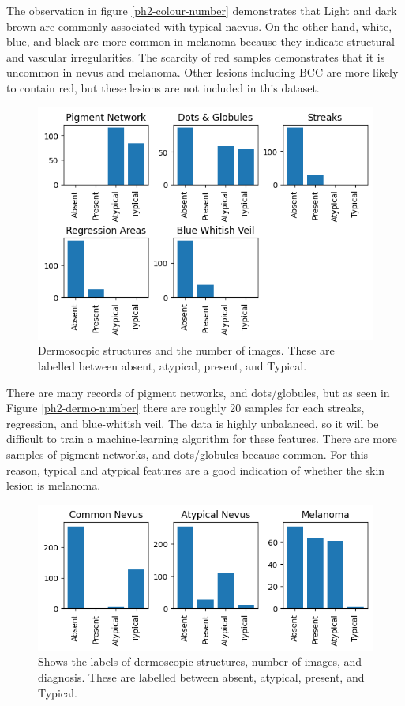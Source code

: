 The observation in figure \ref{ph2-colour-number} demonstrates that Light and dark brown are commonly associated with typical naevus. On the other hand, white, blue, and black are more common in melanoma because they indicate structural and vascular irregularities. The scarcity of red samples demonstrates that it is uncommon in nevus and melanoma. Other lesions including BCC are more likely to contain red\cite{}, but these lesions are not included in this dataset.

\begin{figure}
	\centering
	\includegraphics[scale=0.8]{images/ph2/ph2-dermo-number.png}
	\caption{Dermosocpic structures and the number of images. These are labelled between absent, atypical, present, and Typical.} 
\end{figure} \label{ph2-dermo-number}

There are many records of pigment networks, and dots/globules, but as seen in Figure \ref{ph2-dermo-number} there are roughly 20 samples for each streaks, regression, and blue-whitish veil. The data is highly unbalanced, so it will be difficult to train a machine-learning algorithm for these features. There are more samples of pigment networks, and dots/globules because common. For this reason, typical and atypical features are a good indication of whether the skin lesion is melanoma.

\begin{figure}
	\centering
	\includegraphics[scale=0.8]{images/ph2/ph2-dermo-diagnosis.png}
	\caption{Shows the labels of dermoscopic structures, number of images, and diagnosis. These are labelled between absent, atypical, present, and Typical.} 
\end{figure} \label{ph2-dermo-diagnosis}

